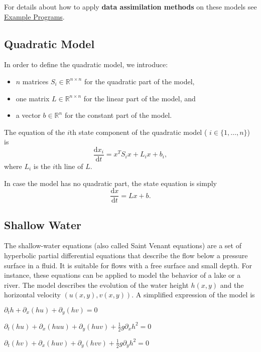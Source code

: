 \documentclass{tufte-book}
\begin{document}
\-For details about how to apply {\bfseries data assimilation methods} on these models see \hyperlink{example_programs}{\-Example \-Programs}.

\hypertarget{quadratic_model}{}\subsection{Quadratic Model}\label{quadratic_model}

\-In order to define the quadratic model, we introduce\-:
\begin{itemize}
\item $n$ matrices $ S_i \in \mathbb{R}^{n \times n} $ for the quadratic part of the model,
\item one matrix $ L \in \mathbb{R}^{n \times n} $ for the linear part of the model, and
\item a vector $b \in \mathbb{R}^n $ for the constant part of the model.
\end{itemize}

\-The equation of the $i$th state component of the quadratic model ( $ i \in \{1,\ldots,n\}$) is \[ \frac{\mathrm{d} x_i}{\mathrm{d} t} = x^T S_i x + L_i x + b_i, \] where $L_i$ is the $i$th line of $L$.

\-In case the model has no quadratic part, the state equation is simply \[ \frac{\mathrm{d} x}{\mathrm{d} t} = L x + b. \]


\hypertarget{shallow_water}{}\subsection{Shallow Water}\label{shallow_water}

The shallow-\/water equations (also called Saint Venant equations) are a set of hyperbolic partial differential equations that describe the flow below a pressure surface in a fluid. It is suitable for flows with a free surface and small depth. For instance, these equations can be applied to model the behavior of a lake or a river. The model describes the evolution of the water height $h(x,y)$ and the horizontal velocity $(u(x,y),v(x,y))$. A simplified expression of the model is


\begin{center} $\partial_th + \partial_x(hu) + \partial_y(hv) = 0$ \par
 $\partial_t(hu) + \partial_x(huu) + \partial_y(huv) +\frac{1}2g\partial_xh^2 = 0$ \par
 $\partial_t(hv) + \partial_x(huv) + \partial_y(hvv) +\frac{1}2g\partial_yh^2 = 0$ \par
 \end{center}
\end{document}
